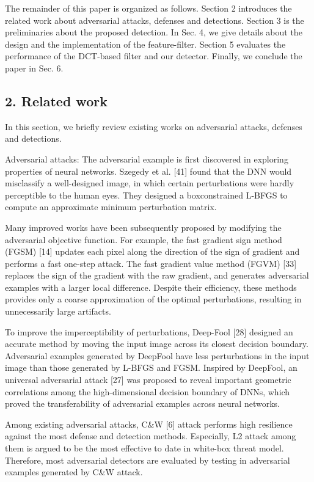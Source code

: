 \documentclass{article}
\begin{document}
The remainder of this paper is organized as follows. Section 2 introduces the related work about adversarial attacks, defenses and detections. Section 3 is the preliminaries about the proposed detection. In Sec. 4, we give details about the design and the implementation of the feature-filter. Section 5 evaluates the performance of the DCT-based filter and our detector. Finally, we conclude the paper in Sec. 6.

\subsection{2. Related work}

In this section, we briefly review existing works on adversarial attacks, defenses and detections.

Adversarial attacks: The adversarial example is first discovered in exploring properties of neural networks. Szegedy et al. [41] found that the DNN would misclassify a well-designed image, in which certain perturbations were hardly perceptible to the human eyes. They designed a boxconstrained L-BFGS to compute an approximate minimum perturbation matrix.

Many improved works have been subsequently proposed by modifying the adversarial objective function. For example, the fast gradient sign method (FGSM) [14] updates each pixel along the direction of the sign of gradient and performs a fast one-step attack. The fast gradient value method (FGVM) [33] replaces the sign of the gradient with the raw gradient, and generates adversarial examples with a larger local difference. Despite their efficiency, these methods provides only a coarse approximation of the optimal perturbations, resulting in unnecessarily large artifacts.

To improve the imperceptibility of perturbations, Deep-Fool [28] designed an accurate method by moving the input image across its closest decision boundary. Adversarial examples generated by DeepFool have less perturbations in the input image than those generated by L-BFGS and FGSM. Inspired by DeepFool, an universal adversarial attack [27] was proposed to reveal important geometric correlations among the high-dimensional decision boundary of DNNs, which proved the transferability of adversarial examples across neural networks.

Among existing adversarial attacks, C\&W [6] attack performs high resilience against the most defense and detection methods. Especially, L2 attack among them is argued to be the most effective to date in white-box threat model. Therefore, most adversarial detectors are evaluated by testing in adversarial examples generated by C\&W attack.
\end{document}

